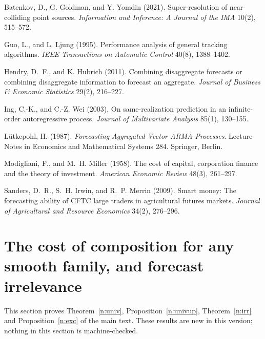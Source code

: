  Batenkov, D., G. Goldman, and Y. Yomdin (2021). Super-resolution of near-colliding point sources. \emph{Information and Inference: A Journal of the IMA} 10(2), 515--572.

 Guo, L., and L. Ljung (1995). Performance analysis of general tracking algorithms. \emph{IEEE Transactions on Automatic Control} 40(8), 1388--1402.

 Hendry, D.~F., and K. Hubrich (2011). Combining disaggregate forecasts or combining disaggregate information to forecast an aggregate. \emph{Journal of Business \& Economic Statistics} 29(2), 216--227.

 Ing, C.-K., and C.-Z. Wei (2003). On same-realization prediction in an infinite-order autoregressive process. \emph{Journal of Multivariate Analysis} 85(1), 130--155.

 L\"utkepohl, H. (1987). \emph{Forecasting Aggregated Vector ARMA Processes}. Lecture Notes in Economics and Mathematical Systems 284. Springer, Berlin.

 Modigliani, F., and M.~H. Miller (1958). The cost of capital, corporation finance and the theory of investment. \emph{American Economic Review} 48(3), 261--297.

 Sanders, D.~R., S.~H. Irwin, and R.~P. Merrin (2009). Smart money: The forecasting ability of CFTC large traders in agricultural futures markets. \emph{Journal of Agricultural and Resource Economics} 34(2), 276--296.


\section{The cost of composition for any smooth family, and forecast irrelevance}\label{app:univirr}

This section proves Theorem~\ref{n:univ}, Proposition~\ref{n:univup}, Theorem~\ref{n:irr} and Proposition~\ref{n:exc} of the main text. These results are new in this version; nothing in this section is machine-checked.

